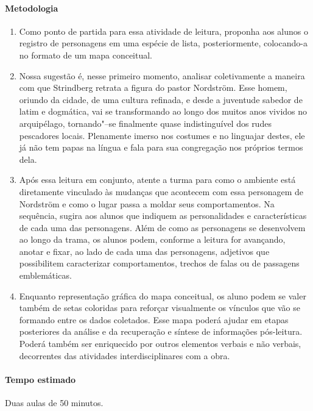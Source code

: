 \documentclass[12pt]{extarticle}
\begin{document}
\paragraph{Metodologia}

\begin{enumerate}

\item
Como ponto de partida para essa atividade de leitura, proponha aos alunos 
o registro de personagens em uma espécie de lista, posteriormente, colocando-a 
no formato de um mapa conceitual. 

\item
Nossa sugestão é, nesse primeiro momento, analisar coletivamente a maneira 
com que Strindberg retrata a figura do pastor Nordström. Esse homem, 
oriundo da cidade, de uma cultura refinada, e desde a juventude sabedor
de latim e dogmática, vai se transformando ao longo dos muitos anos vividos 
no arquipélago, tornando"--se finalmente quase indistinguível dos rudes 
pescadores locais. Plenamente imerso nos costumes e no linguajar destes, 
ele já não tem papas na língua e fala para sua congregação nos próprios 
termos dela.

\item
Após essa leitura em conjunto, atente a turma para como o ambiente está 
diretamente vinculado às mudanças que acontecem com essa personagem de 
Nordström e como o lugar passa a moldar seus comportamentos. Na sequência, 
sugira aos alunos que indiquem as personalidades e características de cada 
uma das personagens. Além de como as personagens se desenvolvem ao longo 
da trama, os alunos podem, conforme a leitura for avançando, anotar e 
fixar, ao lado de cada uma das personagens, adjetivos que possibilitem 
caracterizar comportamentos, trechos de falas ou de passagens emblemáticas. 

\item
Enquanto representação gráfica do mapa conceitual, os aluno podem se valer 
também de setas coloridas para reforçar visualmente os vínculos que vão 
se formando entre os dados coletados. Esse mapa poderá ajudar em etapas 
posteriores da análise e da recuperação e síntese de informações pós-leitura. 
Poderá também ser enriquecido por outros elementos verbais e não verbais, 
decorrentes das atividades interdisciplinares com a obra.

\end{enumerate}

\paragraph{Tempo estimado} Duas aulas de 50 minutos.
\end{document}
